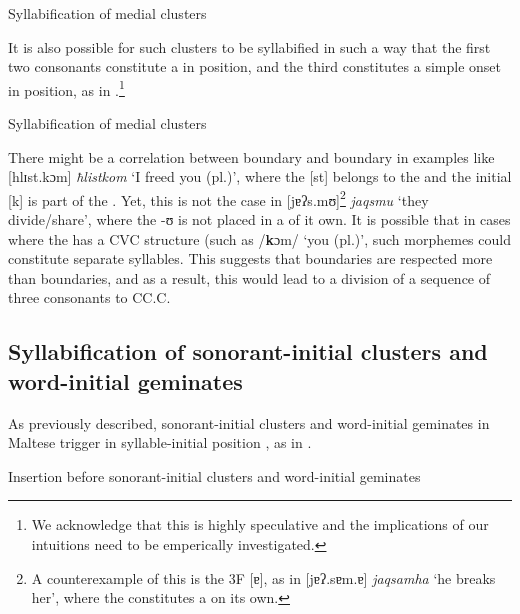 \documentclass[output=paper]{langsci/langscibook}
\begin{document}
\ea\label{ex:galea:12}
{Syllabification of medial clusters} \\
\z
\z

It is also possible for such clusters to be syllabified in such a way that the first two consonants constitute a  in  position, and the third  constitutes a simple onset in  position, as in .\footnote{We acknowledge that this is highly speculative and the implications of our intuitions need to be emperically investigated.}  

\ea\label{ex:galea:13}
{Syllabification of medial clusters}\\
\z
\z

There might be a correlation between  boundary and  boundary in examples like [hlɪst.kɔm] \textit{ħlistkom} ‘I freed you (pl.)’, where the   [st] belongs to the  and the initial [k] is part of the . Yet, this is not the case in [jɐʔs.mʊ]\footnote{A counterexample of this is the 3F  [ɐ], as in [jɐʔ.sɐm.ɐ] \textit{jaqsamha} ‘he breaks her’, where the  constitutes a  on its own.}  \textit{jaqsmu} ‘they divide/share’, where the  -ʊ is not placed in a  of it own. It is possible that in cases where the  has a CVC structure (such as /\textbf{k}ɔm/ ‘you (pl.)’, such morphemes could constitute separate syllables. This suggests that  boundaries are respected more than  boundaries, and as a result, this would lead to a division of a sequence of three consonants to CC.C. 

\subsection{Syllabification of sonorant-initial clusters and word-initial geminates} 
As previously described, sonorant-initial clusters and word-initial geminates in Maltese trigger   in syllable-initial position \citep{azzopardi1981phonetics,maltese_book}, as in . 

\ea\label{ex:galea:14}
{Insertion before sonorant-initial clusters and word-initial geminates}\\
\z
\z
\end{document}
